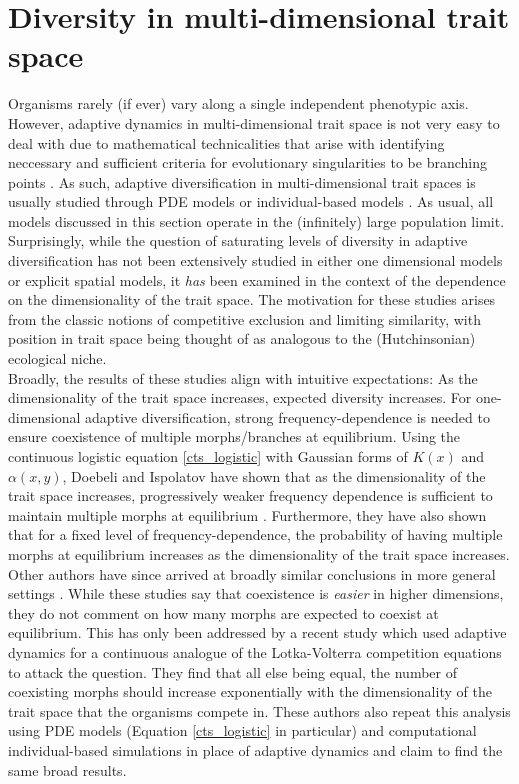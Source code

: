 \section{Diversity in multi-dimensional trait space}\label{high_dim}
Organisms rarely (if ever) vary along a single independent phenotypic axis. However, adaptive dynamics in multi-dimensional trait space is not very easy to deal with due to mathematical technicalities that arise with identifying neccessary and sufficient criteria for evolutionary singularities to be branching points \citep{doebeli_adaptive_2011,leimar_multidimensional_2009}. As such, adaptive diversification in multi-dimensional trait spaces is usually studied through PDE models or individual-based models \citep{ispolatov_individual-based_2016}. As usual, all models discussed in this section operate in the (infinitely) large population limit. Surprisingly, while the question of saturating levels of diversity in adaptive diversification has not been extensively studied in either one dimensional models or explicit spatial models, it \textit{has} been examined in the context of the dependence on the dimensionality of the trait space. The motivation for these studies arises from the classic notions of competitive exclusion and limiting similarity, with position in trait space being thought of as analogous to the (Hutchinsonian) ecological niche.\\
Broadly, the results of these studies align with intuitive expectations: As the dimensionality of the trait space increases, expected diversity increases. For one-dimensional adaptive diversification, strong frequency-dependence is needed to ensure coexistence of multiple morphs/branches at equilibrium. Using the continuous logistic equation \eqref{cts_logistic} with Gaussian forms of $K(x)$ and $\alpha(x,y)$, Doebeli and Ispolatov have shown that as the dimensionality of the trait space increases, progressively weaker frequency dependence is sufficient to maintain multiple morphs at equilibrium \citep{doebeli_complexity_2010}. Furthermore, they have also shown that for a fixed level of frequency-dependence, the probability of having multiple morphs at equilibrium increases as the dimensionality of the trait space increases. Other authors have since arrived at broadly similar conclusions in more general settings \citep{debarre_multidimensional_2014,svardal_organismal_2014}. While these studies say that coexistence is \textit{easier} in higher dimensions, they do not comment on how many morphs are expected to coexist at equilibrium. This has only been addressed by a recent study \citep{doebeli_diversity_2017} which used adaptive dynamics for a continuous analogue of the Lotka-Volterra competition equations to attack the question. They find that all else being equal, the number of coexisting morphs should increase exponentially with the dimensionality of the trait space that the organisms compete in. These authors also repeat this analysis using PDE models (Equation \eqref{cts_logistic} in particular) and computational individual-based simulations in place of adaptive dynamics and claim to find the same broad results.

